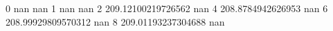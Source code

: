 0 nan nan
1 nan nan
2 209.12100219726562 nan
4 208.8784942626953 nan
6 208.99929809570312 nan
8 209.01193237304688 nan

